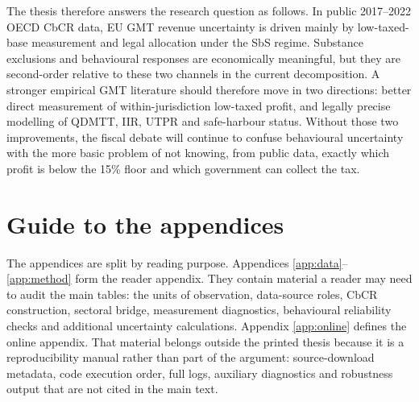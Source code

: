 \documentclass[11pt,a4paper]{article}
\begin{document}
The thesis therefore answers the research question as follows. In public 2017--2022 OECD CbCR data, EU GMT revenue uncertainty is driven mainly by low-taxed-base measurement and legal allocation under the SbS regime. Substance exclusions and behavioural responses are economically meaningful, but they are second-order relative to these two channels in the current decomposition. A stronger empirical GMT literature should therefore move in two directions: better direct measurement of within-jurisdiction low-taxed profit, and legally precise modelling of QDMTT, IIR, UTPR and safe-harbour status. Without those two improvements, the fiscal debate will continue to confuse behavioural uncertainty with the more basic problem of not knowing, from public data, exactly which profit is below the 15\% floor and which government can collect the tax.

\newpage
\printbibliography[heading=bibintoc]

\newpage
\appendix
\renewcommand{\thesection}{\Alph{section}}
\renewcommand{\theHsection}{appendix.\Alph{section}}
\renewcommand{\theHsubsection}{appendix.\Alph{section}.\arabic{subsection}}
\renewcommand{\theHsubsubsection}{appendix.\Alph{section}.\arabic{subsection}.\arabic{subsubsection}}
\renewcommand{\thetable}{\Alph{section}.\arabic{table}}
\renewcommand{\thefigure}{\Alph{section}.\arabic{figure}}
\renewcommand{\theequation}{\Alph{section}.\arabic{equation}}
\renewcommand{\theHtable}{appendix.\Alph{section}.\arabic{table}}
\renewcommand{\theHfigure}{appendix.\Alph{section}.\arabic{figure}}
\renewcommand{\theHequation}{appendix.\Alph{section}.\arabic{equation}}
\setcounter{table}{0}
\setcounter{figure}{0}
\setcounter{equation}{0}

\section*{Guide to the appendices}\label{app:guide}

The appendices are split by reading purpose. Appendices \ref{app:data}--\ref{app:method} form the reader appendix. They contain material a reader may need to audit the main tables: the units of observation, data-source roles, CbCR construction, sectoral bridge, measurement diagnostics, behavioural reliability checks and additional uncertainty calculations. Appendix \ref{app:online} defines the online appendix. That material belongs outside the printed thesis because it is a reproducibility manual rather than part of the argument: source-download metadata, code execution order, full logs, auxiliary diagnostics and robustness output that are not cited in the main text.
\end{document}
